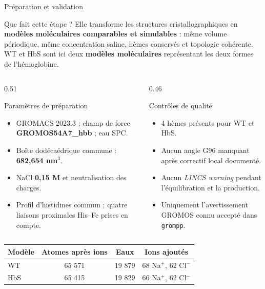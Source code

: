 \documentclass[aspectratio=169,10pt]{beamer}
\begin{document}
\begin{frame}{Préparation et validation}
\small
\begin{block}{Que fait cette étape ?}
\footnotesize
Elle transforme les structures cristallographiques en \textbf{modèles moléculaires comparables et simulables} : même volume périodique, même concentration saline, hèmes conservés et topologie cohérente. WT et HbS sont ici deux \textbf{modèles moléculaires} représentant les deux formes de l'hémoglobine.
\end{block}

\begin{columns}[T,totalwidth=\textwidth]
\begin{column}{0.51\textwidth}
\begin{block}{Paramètres de préparation}
\footnotesize
\begin{itemize}
  \item GROMACS 2023.3 ; champ de force \textbf{GROMOS54A7\_hbb} ; eau SPC.
  \item Boîte dodécaédrique commune : \textbf{682,654 nm\(^3\)}.
  \item NaCl \textbf{0,15 M} et neutralisation des charges.
  \item Profil d'histidines commun ; quatre liaisons proximales His--Fe prises en compte.
\end{itemize}
\end{block}
\end{column}
\begin{column}{0.46\textwidth}
\begin{block}{Contrôles de qualité}
\footnotesize
\begin{itemize}
  \item 4 hèmes présents pour WT et HbS.
  \item Aucun angle G96 manquant après correctif local documenté.
  \item Aucun \textit{LINCS warning} pendant l'équilibration et la production.
  \item Uniquement l'avertissement GROMOS connu accepté dans \texttt{grompp}.
\end{itemize}
\end{block}
\end{column}
\end{columns}
\vspace{0.05em}
\centering
\scriptsize
\begin{tabular}{lccc}
\toprule
Modèle & Atomes après ions & Eaux & Ions ajoutés \\
\midrule
WT & 65 571 & 19 879 & 68 Na\(^+\), 62 Cl\(^-\) \\
HbS & 65 415 & 19 829 & 66 Na\(^+\), 62 Cl\(^-\) \\
\bottomrule
\end{tabular}
\end{frame}
\end{document}
